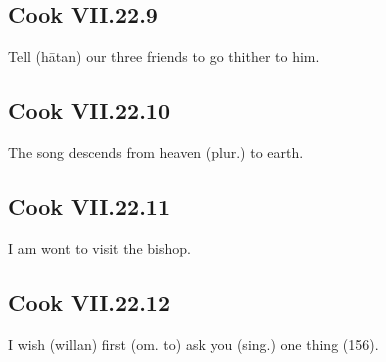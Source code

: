 \par\begin{minipage}{\linewidth}\raggedright
\subsection*{Cook VII.22.9}

Tell (hātan) our three friends to go thither to him.

\end{minipage}\par\addvspace{4pt}

\par\begin{minipage}{\linewidth}\raggedright
\subsection*{Cook VII.22.10}

The song descends from heaven (plur.) to earth.

\end{minipage}\par\addvspace{4pt}

\par\begin{minipage}{\linewidth}\raggedright
\subsection*{Cook VII.22.11}

I am wont to visit the bishop.

\end{minipage}\par\addvspace{4pt}

\par\begin{minipage}{\linewidth}\raggedright
\subsection*{Cook VII.22.12}

I wish (willan) first (om. to) ask you (sing.) one thing (156).

\end{minipage}\par\addvspace{4pt}

